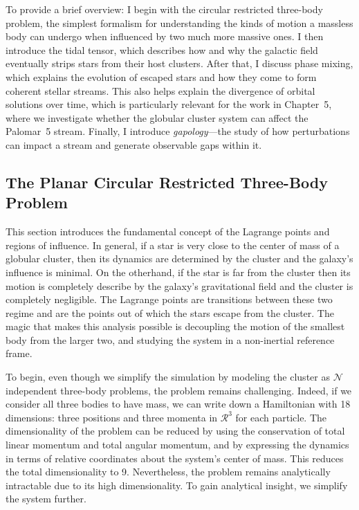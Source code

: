     To provide a brief overview: I begin with the circular restricted three-body problem, the simplest formalism for understanding the kinds of motion a massless body can undergo when influenced by two much more massive ones. I then introduce the tidal tensor, which describes how and why the galactic field eventually strips stars from their host clusters. After that, I discuss phase mixing, which explains the evolution of escaped stars and how they come to form coherent stellar streams. This also helps explain the divergence of orbital solutions over time, which is particularly relevant for the work in Chapter~5, where we investigate whether the globular cluster system can affect the Palomar~5 stream. Finally, I introduce \textit{gapology}—the study of how perturbations can impact a stream and generate observable gaps within it.

    
    \subsection{The Planar Circular Restricted Three-Body Problem}
        
        This section introduces the fundamental concept of the Lagrange points and regions of influence. In general, if a star is very close to the center of mass of a globular cluster, then its dynamics are determined by the cluster and the galaxy's influence is minimal. On the otherhand, if the star is far from the cluster then its motion is completely describe by the galaxy's gravitational field and the cluster is completely negligible. The Lagrange points are transitions between these two regime and are the points out of which the stars escape from the cluster. The magic that makes this analysis possible is decoupling the motion of the smallest body from the larger two, and studying the system in a non-inertial reference frame. 

        To begin, even though we simplify the simulation by modeling the cluster as $\mathcal{N}$ independent three-body problems, the problem remains challenging. Indeed, if we consider all three bodies to have mass, we can write down a Hamiltonian with 18 dimensions: three positions and three momenta in $\mathcal{R}^3$ for each particle. The dimensionality of the problem can be reduced by using the conservation of total linear momentum and total angular momentum, and by expressing the dynamics in terms of relative coordinates about the system's center of mass. This reduces the total dimensionality to 9. Nevertheless, the problem remains analytically intractable due to its high dimensionality. To gain analytical insight, we simplify the system further.
        
